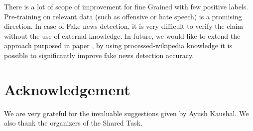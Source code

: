 \documentclass[runningheads]{llncs}
\begin{document}
There is a lot of scope of improvement for fine Grained with few positive labels. Pre-training on relevant data (such as offensive or hate speech) is a promising direction. In case of Fake news detection, it is very difficult to verify the claim without the use of external knowledge. In future, we would like to extend the approach purposed in paper \cite{thorne2018fever}, by using processed-wikipedia knowledge it is possible to significantly improve fake news detection accuracy.

\section*{Acknowledgement}
We are very grateful for the invaluable suggestions given by Ayush Kaushal. We also thank the organizers of the Shared Task.


\end{document}

